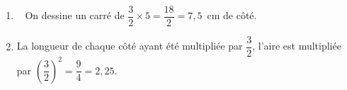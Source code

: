 
\begin{enumerate}
\item ~%
On dessine un carré de $\dfrac{3}{2} \times 5 = \dfrac{18}{2} = 7,5$~cm de côté.
\item %

La longueur de chaque côté ayant été multipliée par $\dfrac{3}{2}$, l'aire est multipliée par $\left(\dfrac{3}{2}\right)^2 = \dfrac{9}{4} = 2,25$.
\end{enumerate}

\vspace{0.5cm}

